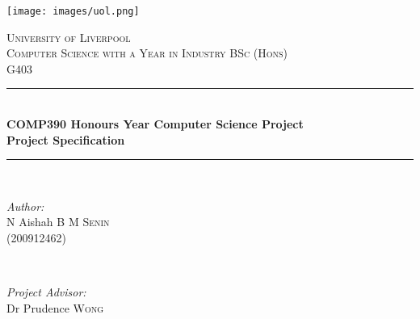 \documentclass[12pt,a4paper,oneside]{report}
\begin{document}

\begin{titlepage}

\newcommand{\HRule}{\rule{\linewidth}{0.5mm}} %

\center %
 

\texttt{[image: images/uol.png]}


\textsc{\LARGE University of Liverpool}\\[1.5cm] %
\textsc{\large Computer Science with a Year in Industry BSc (Hons)}\\[0.5cm] %
\textsc{\large G403}\\[0.5cm] %


\HRule \\[0.4cm]
{ \huge \bfseries COMP390 Honours Year Computer Science Project \\[0.5cm]
Project Specification}\\
[0.4cm] %
\HRule \\[1.5cm]
 

\begin{minipage}{0.4\textwidth}
\begin{flushleft} \large
\emph{Author:}\\
N Aishah \textsc{B M Senin} \\ (200912462) %
\end{flushleft}
\end{minipage}
~
\begin{minipage}{0.4\textwidth}
\begin{flushright} \large
\emph{Project Advisor:} \\
Dr Prudence \textsc{Wong} %
\end{flushright}
\end{minipage}\\[2cm]


\end{titlepage}
\end{document}
